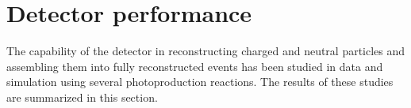 
\section[Detector performance]{Detector performance \label{sec:performance}}                                                 

The capability of the \gx{} detector in reconstructing charged and neutral particles and assembling them into fully reconstructed events has been studied in data and simulation using several photoproduction reactions.  The results of these studies are summarized in this section.




